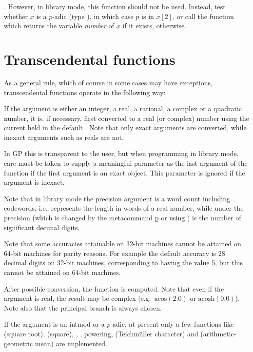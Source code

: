 . However, in library mode, this function should not be used.
Instead, test whether $x$ is a $p$-adic (type ), in which case $p$
is in $x[2]$, or call the function  which returns the variable
\emph{number} of $x$ if it exists,  otherwise.

\section{Transcendental functions}\label{se:trans}

As a general rule, which of course in some cases may have exceptions,
transcendental functions operate in the following way:

\item If the argument is either an integer, a real, a rational, a complex
or a quadratic number, it is, if necessary, first converted to a real (or
complex) number using the current  held in the default
. Note that only exact arguments are converted, while
inexact arguments such as reals are not.

In GP this is transparent to the user, but when programming in library
mode, care must be taken to supply a meaningful parameter  as the
last argument of the function if the first argument is an exact object.
This parameter is ignored if the argument is inexact.

   Note that in library mode the precision argument  is a word
count including codewords, i.e.~represents the length in words of a real
number, while under  the precision (which is changed by the metacommand
\b{p} or using ) is the number of significant
decimal digits.

Note that some accuracies attainable on 32-bit machines cannot be attained
on 64-bit machines for parity reasons. For example the default  accuracy
is 28 decimal digits on 32-bit machines, corresponding to  having
the value 5, but this cannot be attained on 64-bit machines.\smallskip

After possible conversion, the function is computed. Note that even if the
argument is real, the result may be complex (e.g.~$\text{acos}(2.0)$ or
$\text{acosh}(0.0)$). Note also that the principal branch is always chosen.

\item If the argument is an intmod or a $p$-adic, at present only a
few functions like  (square root),  (square), ,
, powering,  (Teichm\"uller character) and
 (arithmetic-geometric mean) are implemented.

